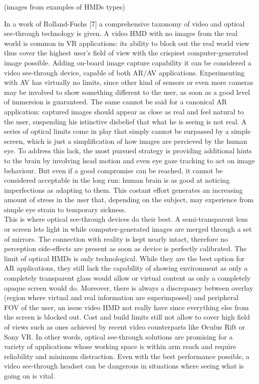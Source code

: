 (images from examples of HMDs types)

In a work of Rolland-Fuchs [7] a comprehensive taxonomy of video and optical see-through technology is given. A video HMD with no images from the real world is common in VR applications: its ability to block out the real world view thus cover the highest user’s field of view with the crispiest computer-generated image possible. Adding on-board image capture capability it can be considered a video see-through device, capable of both AR/AV applications. Experimenting with AV has virtually no limits, since other kind of sensors or even more cameras may be involved to show something different to the user, as soon as a good level of immersion is guaranteed. The same cannot be said for a canonical AR application: captured images should appear as close as real and feel natural to the user, suspending his istinctive disbelief that what he is seeing is not real. A series of optical limits come in play that simply cannot be surpassed by a simple screen, which is just a simplification of how images are percieved by the human eye. To address this lack, the most pursued strategy is providing additional hints to the brain by involving head motion and even eye gaze tracking to act on image behaviour. But even if a good compromise can be reached, it cannot be considered acceptable in the long run: human brain is as good at noticing imperfections as adapting to them. This costant effort generates an increasing amount of stress in the user that, depending on the subject, may experience from simple eye strain to temporary sickness.\\
This is where optical see-through devices do their best. A semi-transparent lens or screen lets light in while computer-generated images are merged through a set of mirrors. The connection with reality is kept nearly intact, therefore no perception side-effects are present as soon as device is perfectly calibrated. The limit of optical HMDs is only technological. While they are the best option for AR applications, they still lack the capability of showing environment as only a completely transparent glass would allow or virtual content as only a completely opaque screen would do. Moreover, there is always a discrepancy between overlay (region where virtual and real information are superimposed) and peripheral FOV of the user, an issue video HMD not really have since everything else from the screen is blocked out. Cost and build limits still not allow to cover high field of views such as ones achieved by recent video counterparts like Oculus Rift or Sony VR. In other words, optical see-through solutions are promising for a variety of applications whose working space is within arm reach and require reliability and minimum distraction. Even with the best performance possible, a video see-through headset can be dangerous in situations where seeing what is going on is vital.\\
